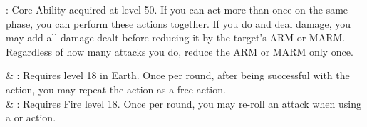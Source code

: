\begin{ffminipage}
\noindent{}: Core Ability acquired at level 50. If you can act more than once on the same phase, you can perform these actions together. If you do and deal damage, you may add all damage dealt before reducing it by the target’s ARM or MARM. Regardless of how many attacks you do, reduce the ARM or MARM only once. \pc

\begin{jobspec}
 & %
: Requires level 18 in Earth. Once per round, after being successful with the  action, you may repeat the action as a free action. \\
 & %
: Requires Fire level 18. Once per round, you may re-roll an attack when using a  or  action. \\
\end{jobspec}
\end{ffminipage}
